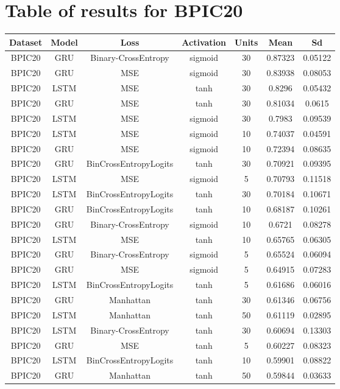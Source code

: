 \documentclass{article}%
\begin{document}
\section{Table of results for BPIC20}%
\label{sec:TableofresultsforBPIC20}%
\begin{longtable}{|c|c|c|c|c|c|c|}%
\hline%
\rowcolor{lightgray!70}%
\textbf{Dataset}&\textbf{Model}&\textbf{Loss}&\textbf{Activation}&\textbf{Units}&\textbf{Mean}&\textbf{Sd}\\%
\hline%
BPIC20&GRU&Binary{-}CrossEntropy&sigmoid&30&0.87323&0.05122\\%
\hline%
BPIC20&GRU&MSE&sigmoid&30&0.83938&0.08053\\%
\hline%
BPIC20&LSTM&MSE&tanh&30&0.8296&0.05432\\%
\hline%
BPIC20&GRU&MSE&tanh&30&0.81034&0.0615\\%
\hline%
BPIC20&LSTM&MSE&sigmoid&30&0.7983&0.09539\\%
\hline%
BPIC20&LSTM&MSE&sigmoid&10&0.74037&0.04591\\%
\hline%
BPIC20&GRU&MSE&sigmoid&10&0.72394&0.08635\\%
\hline%
BPIC20&GRU&BinCrossEntropyLogits&tanh&30&0.70921&0.09395\\%
\hline%
BPIC20&LSTM&MSE&sigmoid&5&0.70793&0.11518\\%
\hline%
BPIC20&LSTM&BinCrossEntropyLogits&tanh&30&0.70184&0.10671\\%
\hline%
BPIC20&GRU&BinCrossEntropyLogits&tanh&10&0.68187&0.10261\\%
\hline%
BPIC20&GRU&Binary{-}CrossEntropy&sigmoid&10&0.6721&0.08278\\%
\hline%
BPIC20&LSTM&MSE&tanh&10&0.65765&0.06305\\%
\hline%
BPIC20&GRU&Binary{-}CrossEntropy&sigmoid&5&0.65524&0.06094\\%
\hline%
BPIC20&GRU&MSE&sigmoid&5&0.64915&0.07283\\%
\hline%
BPIC20&LSTM&BinCrossEntropyLogits&tanh&5&0.61686&0.06016\\%
\hline%
BPIC20&GRU&Manhattan&tanh&30&0.61346&0.06756\\%
\hline%
BPIC20&LSTM&Manhattan&tanh&50&0.61119&0.02895\\%
\hline%
BPIC20&LSTM&Binary{-}CrossEntropy&tanh&30&0.60694&0.13303\\%
\hline%
BPIC20&GRU&MSE&tanh&5&0.60227&0.08323\\%
\hline%
BPIC20&LSTM&BinCrossEntropyLogits&tanh&10&0.59901&0.08822\\%
\hline%
BPIC20&GRU&Manhattan&tanh&50&0.59844&0.03633\\%

\end{longtable}
\end{document}
